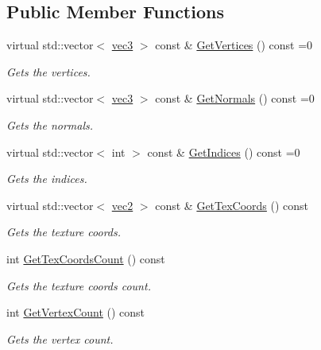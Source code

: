 \subsection*{Public Member Functions}
\begin{DoxyCompactItemize}
\item 
virtual std\+::vector$<$ \hyperlink{_types_8h_a3d0ce73e3199de81565fb01632415288}{vec3} $>$ const \& \hyperlink{class_i_mesh_afb0bb17c66970b42cd883cf7ea2c6199}{Get\+Vertices} () const  =0
\begin{DoxyCompactList}\small\item\em Gets the vertices. \end{DoxyCompactList}\item 
virtual std\+::vector$<$ \hyperlink{_types_8h_a3d0ce73e3199de81565fb01632415288}{vec3} $>$ const \& \hyperlink{class_i_mesh_a2c856178275884f78deb0c5ebd497cc7}{Get\+Normals} () const  =0
\begin{DoxyCompactList}\small\item\em Gets the normals. \end{DoxyCompactList}\item 
virtual std\+::vector$<$ int $>$ const \& \hyperlink{class_i_mesh_ab750669f5d9be25853c0e8bed73b0d3e}{Get\+Indices} () const  =0
\begin{DoxyCompactList}\small\item\em Gets the indices. \end{DoxyCompactList}\item 
virtual std\+::vector$<$ \hyperlink{_types_8h_a43182e59794291f6ab00e51b160706c2}{vec2} $>$ const \& \hyperlink{class_i_mesh_a004281af991b75bda5dfda6d9c9c7849}{Get\+Tex\+Coords} () const 
\begin{DoxyCompactList}\small\item\em Gets the texture coords. \end{DoxyCompactList}\item 
int \hyperlink{class_i_mesh_a85469248e71ed9401c61573d32be44f4}{Get\+Tex\+Coords\+Count} () const 
\begin{DoxyCompactList}\small\item\em Gets the texture coords count. \end{DoxyCompactList}\item 
int \hyperlink{class_i_mesh_aff814631d73a51d364824632beabe147}{Get\+Vertex\+Count} () const 
\begin{DoxyCompactList}\small\item\em Gets the vertex count. \end{DoxyCompactList}\item 

\end{DoxyCompactItemize}
